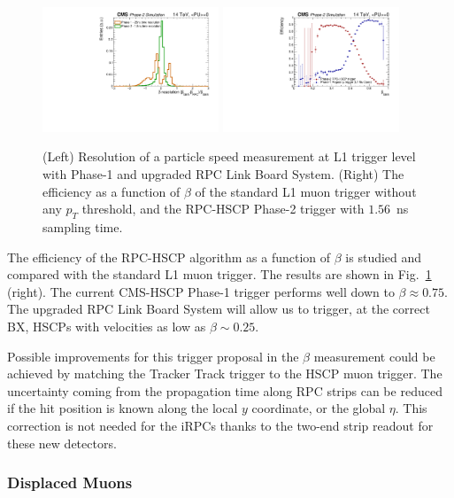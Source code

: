 \begin{figure}[h!tbp]
\begin{center}
  \includegraphics[width=0.47\textwidth]{figures/HSCP/beta_GenRes_2.pdf} \hfill
  \includegraphics[width=0.47\textwidth]{figures/HSCP/trigEff-Mu-HSCPTriggers.pdf}
  \caption{
(Left) Resolution of a particle speed measurement at L1 trigger level with Phase-1 and upgraded RPC Link Board System. 
(Right) The efficiency as a function of $\beta$ of the standard L1 muon trigger without any $p_T$ threshold, 
  and the RPC-HSCP Phase-2 trigger with $1.56$~ns sampling time.
}
  \label{fig:HCP_Trigger}
\end{center}
\end{figure}

The efficiency of the RPC-HSCP algorithm as a function of $\beta$ is studied and compared with the
standard L1 muon trigger. The results are shown in Fig.~\ref{fig:HCP_Trigger} (right).
The current CMS-HSCP Phase-1 trigger performs well down to $\beta \approx 0.75$. 
The upgraded RPC Link Board System will allow us to trigger, at the
correct BX, HSCPs with velocities as low as $\beta \sim 0.25$.


Possible improvements for this trigger proposal in the $\beta$ measurement could be achieved by matching the Tracker Track trigger to the HSCP muon trigger. The uncertainty coming from the propagation time along RPC strips can be reduced if the hit position is known along the local $y$ coordinate, or the global $\eta$. This correction is not needed for the iRPCs thanks to the two-end strip readout for these new detectors.

\subsubsection{Displaced Muons} 

